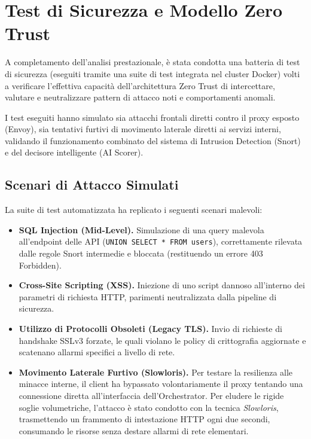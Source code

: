 \section{Test di Sicurezza e Modello Zero Trust}

A completamento dell'analisi prestazionale, è stata condotta una batteria di test di sicurezza (eseguiti tramite una suite di test integrata nel cluster Docker) volti a verificare l'effettiva capacità dell'architettura Zero Trust di intercettare, valutare e neutralizzare pattern di attacco noti e comportamenti anomali. 

I test eseguiti hanno simulato sia attacchi frontali diretti contro il proxy esposto (Envoy), sia tentativi furtivi di movimento laterale diretti ai servizi interni, validando il funzionamento combinato del sistema di Intrusion Detection (Snort) e del decisore intelligente (AI Scorer).

\subsection{Scenari di Attacco Simulati}
La suite di test automatizzata ha replicato i seguenti scenari malevoli:
\begin{itemize}
    \item \textbf{SQL Injection (Mid-Level).} Simulazione di una query malevola all'endpoint delle API (\texttt{UNION SELECT * FROM users}), correttamente rilevata dalle regole Snort intermedie e bloccata (restituendo un errore 403 Forbidden).
    \item \textbf{Cross-Site Scripting (XSS).} Iniezione di uno script dannoso all'interno dei parametri di richiesta HTTP, parimenti neutralizzata dalla pipeline di sicurezza.
    \item \textbf{Utilizzo di Protocolli Obsoleti (Legacy TLS).} Invio di richieste di handshake SSLv3 forzate, le quali violano le policy di crittografia aggiornate e scatenano allarmi specifici a livello di rete.
    \item \textbf{Movimento Laterale Furtivo (Slowloris).} Per testare la resilienza alle minacce interne, il client ha bypassato volontariamente il proxy tentando una connessione diretta all'interfaccia dell'Orchestrator. Per eludere le rigide soglie volumetriche, l'attacco è stato condotto con la tecnica \textit{Slowloris}, trasmettendo un frammento di intestazione HTTP ogni due secondi, consumando le risorse senza destare allarmi di rete elementari.
\end{itemize}

